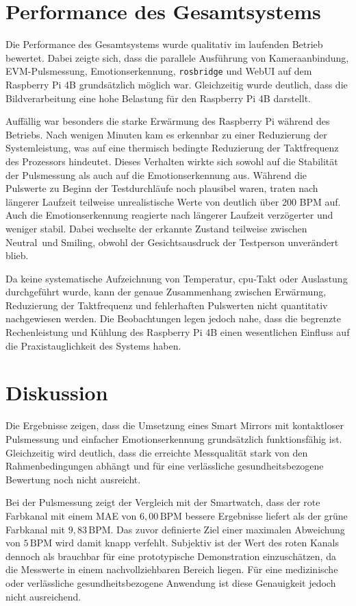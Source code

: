 \section{Performance des Gesamtsystems}

Die Performance des Gesamtsystems wurde qualitativ im laufenden Betrieb bewertet. Dabei zeigte sich, dass die parallele Ausführung von Kameraanbindung, EVM-Pulsmessung, Emotionserkennung, \texttt{rosbridge} und WebUI auf dem Raspberry Pi 4B grundsätzlich möglich war. Gleichzeitig wurde deutlich, dass die Bildverarbeitung eine hohe Belastung für den Raspberry Pi 4B darstellt.

Auffällig war besonders die starke Erwärmung des Raspberry Pi während des Betriebs. Nach wenigen Minuten kam es erkennbar zu einer Reduzierung der Systemleistung, was auf eine thermisch bedingte Reduzierung der Taktfrequenz des Prozessors hindeutet. Dieses Verhalten wirkte sich sowohl auf die Stabilität der Pulsmessung als auch auf die Emotionserkennung aus. Während die Pulswerte zu Beginn der Testdurchläufe noch plausibel waren, traten nach längerer Laufzeit teilweise unrealistische Werte von deutlich über 200 BPM auf. Auch die Emotionserkennung reagierte nach längerer Laufzeit verzögerter und weniger stabil. Dabei wechselte der erkannte Zustand teilweise zwischen \glqq Neutral\grqq\ und \glqq Smiling\grqq, obwohl der Gesichtsausdruck der Testperson unverändert blieb.

Da keine systematische Aufzeichnung von Temperatur, \ac{cpu}-Takt oder Auslastung durchgeführt wurde, kann der genaue Zusammenhang zwischen Erwärmung, Reduzierung der Taktfrequenz und fehlerhaften Pulswerten nicht quantitativ nachgewiesen werden. Die Beobachtungen legen jedoch nahe, dass die begrenzte Rechenleistung und Kühlung des Raspberry Pi 4B einen wesentlichen Einfluss auf die Praxistauglichkeit des Systems haben.

\section{Diskussion}

Die Ergebnisse zeigen, dass die Umsetzung eines Smart Mirrors mit kontaktloser Pulsmessung und einfacher Emotionserkennung grundsätzlich funktionsfähig ist. Gleichzeitig wird deutlich, dass die erreichte Messqualität stark von den Rahmenbedingungen abhängt und für eine verlässliche gesundheitsbezogene Bewertung noch nicht ausreicht.

Bei der Pulsmessung zeigt der Vergleich mit der Smartwatch, dass der rote Farbkanal mit einem MAE von \(6{,}00\,\mathrm{BPM}\) bessere Ergebnisse liefert als der grüne Farbkanal mit \(9{,}83\,\mathrm{BPM}\). Das zuvor definierte Ziel einer maximalen Abweichung von \(5\,\mathrm{BPM}\) wird damit knapp verfehlt. Subjektiv ist der Wert des roten Kanals dennoch als brauchbar für eine prototypische Demonstration einzuschätzen, da die Messwerte in einem nachvollziehbaren Bereich liegen. Für eine medizinische oder verlässliche gesundheitsbezogene Anwendung ist diese Genauigkeit jedoch nicht ausreichend.

